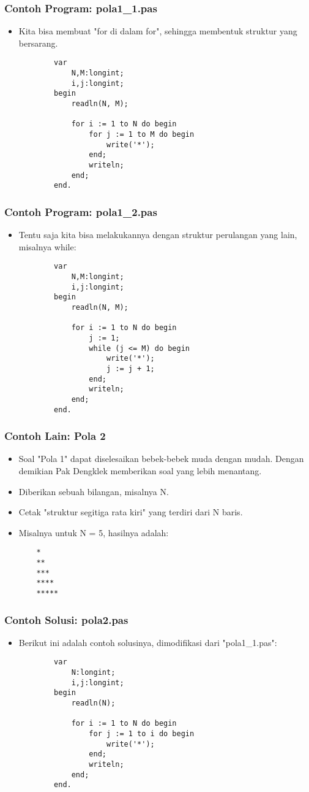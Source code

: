 \documentclass{beamer}
\begin{document}
\begin{frame}[fragile]
\frametitle{Contoh Program: pola1\_1.pas}
\begin{itemize}
	\item Kita bisa membuat "for di dalam for", sehingga membentuk struktur yang bersarang.
	\begin{lstlisting}
		var
		    N,M:longint;
		    i,j:longint;
		begin
		    readln(N, M);
		
		    for i := 1 to N do begin
		        for j := 1 to M do begin
		            write('*');
		        end;
		        writeln;
		    end;
		end.
	\end{lstlisting}
\end{itemize}
\end{frame}

\begin{frame}[fragile]
\frametitle{Contoh Program: pola1\_2.pas}
\begin{itemize}
	\item Tentu saja kita bisa melakukannya dengan struktur perulangan yang lain, misalnya while:
	\begin{lstlisting}
		var
		    N,M:longint;
		    i,j:longint;
		begin
		    readln(N, M);
		
		    for i := 1 to N do begin
		        j := 1;
		        while (j <= M) do begin
		            write('*');
		            j := j + 1;
		        end;
		        writeln;
		    end;
		end.
	\end{lstlisting}
\end{itemize}
\end{frame}

\begin{frame}[fragile]
\frametitle{Contoh Lain: Pola 2}
\begin{itemize}
	\item Soal "Pola 1" dapat diselesaikan bebek-bebek muda dengan mudah. Dengan demikian Pak Dengklek memberikan soal yang lebih menantang.
	\item Diberikan sebuah bilangan, misalnya N.
	\item Cetak "struktur segitiga rata kiri" yang terdiri dari N baris.
	\item Misalnya untuk N = 5, hasilnya adalah:
	\begin{lstlisting}
	*
	**
	***
	****
	*****
	\end{lstlisting} 
\end{itemize}
\end{frame}

\begin{frame}[fragile]
\frametitle{Contoh Solusi: pola2.pas}
\begin{itemize}
	\item Berikut ini adalah contoh solusinya, dimodifikasi dari "pola1\_1.pas":
	\begin{lstlisting}
		var
		    N:longint;
		    i,j:longint;
		begin
		    readln(N);
		
		    for i := 1 to N do begin
		        for j := 1 to i do begin
		            write('*');
		        end;
		        writeln;
		    end;
		end.
	\end{lstlisting}
\end{itemize}
\end{frame}
\end{document}

